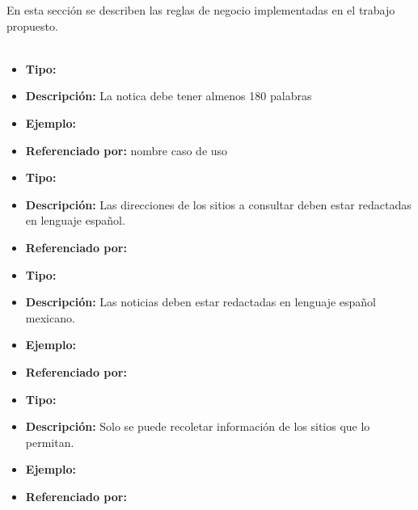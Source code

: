 
  
  En esta sección se describen las reglas de negocio implementadas en el trabajo propuesto.\\\\


    \begin{itemize}
      \item \textbf{Tipo:}  
      \item \textbf{Descripción:}  La notica debe tener almenos 180 palabras
      \item \textbf{Ejemplo:}
      \item \textbf{Referenciado por:} nombre caso de uso \\
    \end{itemize}


    \begin{itemize}
      \item \textbf{Tipo:}  
      \item \textbf{Descripción:} Las direcciones de los sitios a consultar deben estar redactadas en lenguaje español.
      \item \textbf{Referenciado por:}  \\
    \end{itemize}


    \begin{itemize}
      \item \textbf{Tipo:}  
      \item \textbf{Descripción:} Las noticias deben estar redactadas en lenguaje español mexicano.
      \item \textbf{Ejemplo:}
      \item \textbf{Referenciado por:}  \\
    \end{itemize}


    \begin{itemize}
      \item \textbf{Tipo:}  
      \item \textbf{Descripción:} Solo se puede recoletar información de los sitios que lo permitan.
      \item \textbf{Ejemplo:}
      \item \textbf{Referenciado por:}  \\
    \end{itemize}

